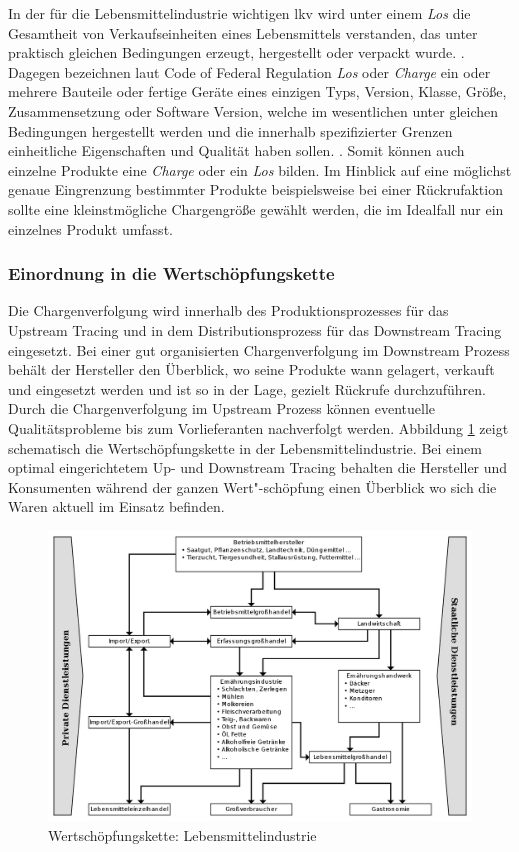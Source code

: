 In der für die Lebensmittelindustrie wichtigen \ac{lkv} wird unter einem \textit{Los} \glqq die Gesamtheit von Verkaufseinheiten eines Lebensmittels verstanden, das unter praktisch gleichen Bedingungen erzeugt, hergestellt oder verpackt wurde.\grqq{} \citep{LKV1993}. Dagegen bezeichnen laut Code of Federal Regulation \textit{Los} oder \textit{Charge} \glqq ein oder mehrere Bauteile oder fertige Geräte eines einzigen Typs, Version, Klasse, Größe, Zusammensetzung oder Software Version, welche im wesentlichen unter gleichen Bedingungen hergestellt werden und die innerhalb spezifizierter Grenzen einheitliche Eigenschaften und Qualität haben sollen.\grqq{} \citep{QSR1996}. Somit können auch einzelne Produkte eine \textit{Charge} oder ein \textit{Los} bilden. Im Hinblick auf eine möglichst genaue Eingrenzung bestimmter Produkte beispielsweise bei einer Rückrufaktion sollte eine kleinstmögliche Chargengröße gewählt werden, die im Idealfall nur ein einzelnes Produkt umfasst.

\subsubsection{Einordnung in die Wertschöpfungskette}

Die Chargenverfolgung wird innerhalb des Produktionsprozesses für das Upstream Tracing und in dem Distributionsprozess für das Downstream Tracing eingesetzt. Bei einer gut organisierten Chargenverfolgung im Downstream Prozess behält der Hersteller den Überblick, wo seine Produkte wann gelagert, verkauft und eingesetzt werden und ist so in der Lage, gezielt Rückrufe durchzuführen. Durch die Chargenverfolgung im Upstream Prozess können eventuelle Qualitätsprobleme bis zum Vorlieferanten nachverfolgt werden. Abbildung \ref{fig:wkd-Lebensmittelindustrie} zeigt schematisch die Wertschöpfungskette in der Lebensmittelindustrie. Bei einem optimal eingerichtetem Up- und Downstream Tracing behalten die Hersteller und Konsumenten während der ganzen Wert"-schöpfung einen Überblick wo sich die Waren aktuell im Einsatz befinden.

\begin{figure}[h!]
	\centering
	\includegraphics[width=1.0\linewidth]{pictures/system-of-agribusiness}
	\caption[Wertschöpfungskette: Lebensmittelindustrie]{Wertschöpfungskette: Lebensmittelindustrie}
	\label{fig:wkd-Lebensmittelindustrie}
\end{figure}

